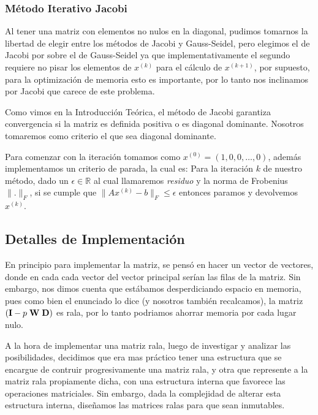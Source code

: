 \subsubsection{Método Iterativo Jacobi}

Al tener una matriz con elementos no nulos en la diagonal, pudimos tomarnos la libertad de elegir entre los métodos de Jacobi y Gauss-Seidel, pero elegimos el de Jacobi por sobre el de Gauss-Seidel ya que implementativamente el segundo requiere no pisar los elementos de $x^{(k)}$ para el cálculo de $x^{(k + 1)}$, por supuesto, para la optimización de memoria esto es importante, por lo tanto nos inclinamos por Jacobi que carece de este problema.

Como vimos en la Introducción Teórica, el método de Jacobi garantiza convergencia si la matriz es definida positiva o es diagonal dominante. Nosotros tomaremos como criterio el que sea diagonal dominante.

Para comenzar con la iteración tomamos como $x^{(0)} = (1, 0, 0, \dots,0)$, además implementamos un criterio de parada, la cual es: Para la iteración $k$ de nuestro método, dado un $\epsilon \in \mathbb{R}$ al cual llamaremos \emph{residuo} y la norma de Frobenius $\parallel . \parallel_F$, si se cumple que $\parallel Ax^{(k)} - b \parallel_F \leq \epsilon$ entonces paramos y devolvemos $x^{(k)}$.

\subsection{Detalles de Implementación}

En principio para implementar la matriz, se pensó en hacer un vector de vectores, donde en cada cada vector del vector principal serían las filas de la matriz. Sin embargo, nos dimos cuenta que estábamos desperdiciando espacio en memoria, pues como bien el enunciado lo dice (y nosotros también recalcamos), la matriz $({\bf I} - p \; {\bf W} \; {\bf D})$ es rala, por lo tanto podriamos ahorrar memoria por cada lugar nulo.

A la hora de implementar una matriz rala, luego de investigar y analizar las
posibilidades, decidimos que era mas práctico tener una estructura que se
encargue de contruir progresivamente una matriz rala, y otra que represente
a la matriz rala propiamente dicha, con una estructura interna que favorece las
operaciones matriciales. Sin embargo, dada la complejidad de alterar
esta estructura interna, diseñamos las matrices ralas para que sean inmutables.

